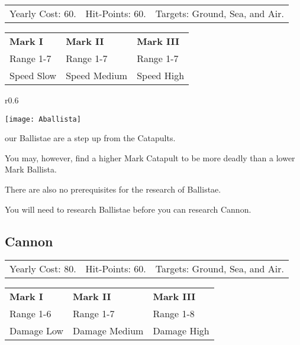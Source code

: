 
\begin{tabular}{p{1.264in} p{1.264in} p{1.264in}}
	Yearly Cost: 60. & Hit-Points: 60. & Targets: Ground, Sea, and Air.
\end{tabular}

\begin{tabular}{|p{1.264in} p{1.264in} p{1.264in}|}
	\hline
	\textbf{Mark I}	& \textbf{Mark II} & \textbf{Mark III} \\ 
	Range 1-7 & Range 1-7& Range 1-7 \\ 
	Speed Slow & Speed Medium & Speed High \\ 
	\hline
\end{tabular}

\begin{wrapfigure}{r}{0.6\textwidth}
	\vspace{-20pt}
	\begin{center}
		\texttt{[image: Aballista]} %
	\end{center}
	\vspace{-20pt}
\end{wrapfigure}

our Ballistae are a step up from the Catapults.

You may, however, find a higher Mark Catapult to be more deadly than a lower Mark Ballista.

There are also no prerequisites for the research of Ballistae.

You will need to research Ballistae before you can research Cannon.

\clearpage

\subsection{Cannon}



\begin{tabular}{p{1.264in} p{1.264in} p{1.264in}}
	Yearly Cost: 80. & Hit-Points: 60. & Targets: Ground, Sea, and Air.
\end{tabular}

\begin{tabular}{| p{1.264in} p{1.264in} p{1.264in}|}
	\hline
	\textbf{Mark I}	& \textbf{Mark II} & \textbf{Mark III} \\ 
	Range 1-6 & Range 1-7 & Range 1-8 \\ 
	Damage Low & Damage Medium & Damage High \\ 
	\hline
\end{tabular}
   

